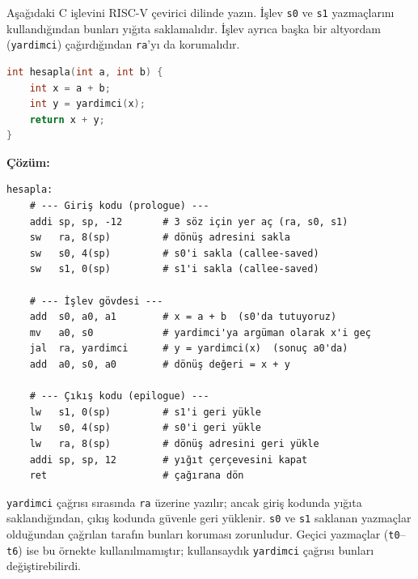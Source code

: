 \begin{ornek}[3.18]
\label{orn:prologue-epilogue}
Aşağıdaki C işlevini RISC-V çevirici dilinde yazın. İşlev \texttt{s0} ve \texttt{s1} yazmaçlarını kullandığından bunları yığıta saklamalıdır. İşlev ayrıca başka bir altyordam (\texttt{yardimci}) çağırdığından \texttt{ra}'yı da korumalıdır.
\begin{lstlisting}[language=C]
int hesapla(int a, int b) {
    int x = a + b;
    int y = yardimci(x);
    return x + y;
}
\end{lstlisting}

\textbf{Çözüm:}
\begin{lstlisting}[style=riscv]
hesapla:
    # --- Giriş kodu (prologue) ---
    addi sp, sp, -12       # 3 söz için yer aç (ra, s0, s1)
    sw   ra, 8(sp)         # dönüş adresini sakla
    sw   s0, 4(sp)         # s0'i sakla (callee-saved)
    sw   s1, 0(sp)         # s1'i sakla (callee-saved)

    # --- İşlev gövdesi ---
    add  s0, a0, a1        # x = a + b  (s0'da tutuyoruz)
    mv   a0, s0            # yardimci'ya argüman olarak x'i geç
    jal  ra, yardimci      # y = yardimci(x)  (sonuç a0'da)
    add  a0, s0, a0        # dönüş değeri = x + y

    # --- Çıkış kodu (epilogue) ---
    lw   s1, 0(sp)         # s1'i geri yükle
    lw   s0, 4(sp)         # s0'i geri yükle
    lw   ra, 8(sp)         # dönüş adresini geri yükle
    addi sp, sp, 12        # yığıt çerçevesini kapat
    ret                    # çağırana dön
\end{lstlisting}

\texttt{yardimci} çağrısı sırasında \texttt{ra} üzerine yazılır; ancak giriş kodunda yığıta saklandığından, çıkış kodunda güvenle geri yüklenir. \texttt{s0} ve \texttt{s1} saklanan yazmaçlar olduğundan çağrılan tarafın bunları koruması zorunludur. Geçici yazmaçlar (\texttt{t0}--\texttt{t6}) ise bu örnekte kullanılmamıştır; kullansaydık \texttt{yardimci} çağrısı bunları değiştirebilirdi.
\end{ornek}

